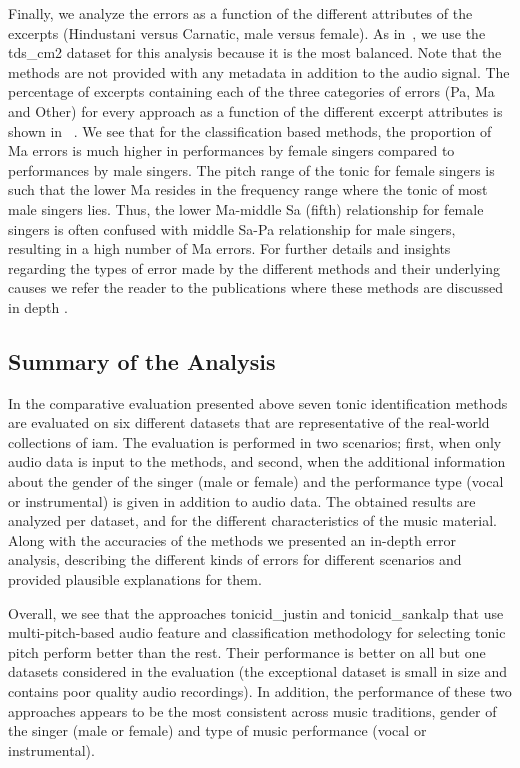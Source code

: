{Finally, we analyze the errors as a function of the different attributes of the excerpts (Hindustani versus Carnatic, male versus female). As in~, we use the \acrshort{tds_cm2} dataset for this analysis because it is the most balanced. Note that the methods are not provided with any metadata in addition to the audio signal. The percentage of excerpts containing each of the three categories of errors (Pa, Ma and Other) for every approach as a function of the different excerpt attributes is shown in ~. We see that for the classification based methods, the proportion of Ma errors is much higher in performances by female singers compared to performances by male singers. The pitch range of the tonic for female singers is such that the lower Ma resides in the frequency range where the tonic of most male singers lies. Thus, the lower Ma-middle Sa (fifth) relationship for female singers is often confused with middle Sa-Pa relationship for male singers, resulting in a high number of Ma errors. For further details and insights regarding the types of error made by the
different methods and their underlying causes we refer the reader to the publications where these methods are discussed in depth \citep{salamon2012multipitch, SGulati_MThesis2012,bellur2012knowledge,ranjani2011carnatic}.


\subsection{Summary of the Analysis }
\label{sec:pre_processing_tonic_identification_summary}

In the comparative evaluation presented above seven tonic identification methods are evaluated on six different datasets that are representative of the real-world collections of \gls{iam}. The evaluation is performed in two scenarios; first, when only audio data is input to the methods, and second, when the additional information about the gender of the singer (male or female) and  the performance type (vocal or instrumental) is given in addition to audio data. The obtained results are analyzed per dataset, and for the different characteristics of the music material. Along with the accuracies of the methods we presented an in-depth error analysis, describing the different kinds of errors for different scenarios and provided plausible explanations for them.

Overall, we see that the approaches \acrshort{tonicid_justin} and \acrshort{tonicid_sankalp} that use multi-pitch-based audio feature and classification methodology for selecting tonic pitch perform better than the rest. Their performance is better on all but one datasets considered in the evaluation (the exceptional dataset is small in size and contains poor quality audio recordings). In addition, the performance of these two approaches appears to be the most consistent across music traditions, gender of the singer (male or female) and type of music performance (vocal or instrumental). 

}

